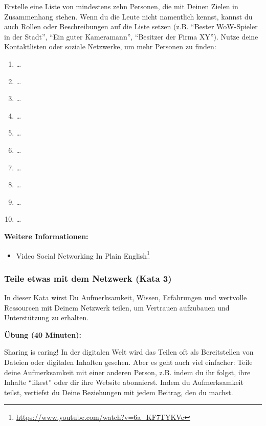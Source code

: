 \documentclass[
  ngerman,
  paper=a4,
,captions=tableheading
]{scrartcl}
\DeclareRobustCommand{\href}[2]{#2\footnote{\url{#1}}}
\providecommand{\tightlist}{%
  \setlength{\itemsep}{0pt}\setlength{\parskip}{0pt}}
\begin{document}
Erstelle eine Liste von mindestens zehn Personen, die mit Deinen Zielen
in Zusammenhang stehen. Wenn du die Leute nicht namentlich kennst,
kannst du auch Rollen oder Beschreibungen auf die Liste setzen (z.B.
``Bester WoW-Spieler in der Stadt'', ``Ein guter Kameramann'',
``Besitzer der Firma XY''). Nutze deine Kontaktlisten oder soziale
Netzwerke, um mehr Personen zu finden:

\begin{enumerate}
\def\labelenumi{\arabic{enumi}.}
\tightlist
\item
  \ldots{}
\item
  \ldots{}
\item
  \ldots{}
\item
  \ldots{}
\item
  \ldots{}
\item
  \ldots{}
\item
  \ldots{}
\item
  \ldots{}
\item
  \ldots{}
\item
  \ldots{}
\end{enumerate}

\textbf{Weitere Informationen:}

\begin{itemize}
\tightlist
\item
  Video \href{https://www.youtube.com/watch?v=6a_KF7TYKVc}{Social
  Networking In Plain English}
\end{itemize}

\hypertarget{teile-etwas-mit-dem-netzwerk-kata-3}{%
\subsubsection{Teile etwas mit dem Netzwerk (Kata
3)}\label{teile-etwas-mit-dem-netzwerk-kata-3}}

In dieser Kata wirst Du Aufmerksamkeit, Wissen, Erfahrungen und
wertvolle Ressourcen mit Deinem Netzwerk teilen, um Vertrauen aufzubauen
und Unterstützung zu erhalten.

\textbf{Übung (40 Minuten):}

Sharing is caring! In der digitalen Welt wird das Teilen oft als
Bereitstellen von Dateien oder digitalen Inhalten gesehen. Aber es geht
auch viel einfacher: Teile deine Aufmerksamkeit mit einer anderen
Person, z.B. indem du ihr folgst, ihre Inhalte ``likest'' oder dir ihre
Website abonnierst. Indem du Aufmerksamkeit teilst, vertiefst du Deine
Beziehungen mit jedem Beitrag, den du machst.
\end{document}
